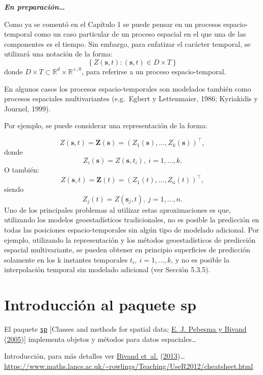 \documentclass[
  spanish,
]{book}
\theoremstyle{break}
\theoremstyle{definition}
\theoremstyle{definition}
\theoremstyle{definition}
\theoremstyle{definition}
\theoremstyle{remark}
\begin{document}
\textbf{\emph{En preparación\ldots{}}}

Como ya se comentó en el Capítulo 1 se puede pensar en un procesos espacio-temporal como un caso particular de un proceso espacial en el que una de las componentes es el tiempo.
Sin embargo, para enfatizar el carácter temporal, se utilizará una notación de la forma:
\[\left\{ Z(\mathbf{s},t):(\mathbf{s},t)\in D\times T\right\}\]
donde \(D\times T\subset \mathbb{R} ^{d} \times \mathbb{R}^{+,0}\), para
referirse a un proceso espacio-temporal.

En algunos casos los procesos espacio-temporales son modelados también
como procesos espaciales multivariantes (e.g.~Egbert y Lettenmaier,
1986; Kyriakidis y Journel, 1999).

Por ejemplo, se puede considerar una representación de la forma:

\[Z(\mathbf{s},t)=\mathbf{Z}(\mathbf{s})=(Z_{1} (\mathbf{s}), \ldots,Z_{k} (
\mathbf{s}))^\top,\]
donde
\[Z_{i} (\mathbf{s})=Z(\mathbf{s},t_{i} ),\  i=1, \ldots,k.\]
O también:
\[Z(\mathbf{s},t) = \mathbf{Z}(t) =  \left(Z_{1}(t), \ldots, Z_{n}(t) \right)^\top,\]
siendo
\[Z_{j} (t)=Z(\mathbf{s}_{j} ,t),\  j=1, \ldots,n.\]
Uno de los principales problemas al utilizar estas aproximaciones es que, utilizando los modelos geoestadísticos tradicionales, no es posible la
predicción en todas las posiciones espacio-temporales sin algún tipo de
modelado adicional. Por ejemplo, utilizando la representación y los métodos geoestadísticos de predicción espacial multivariante, se pueden obtener en principio superficies de predicción solamente en los k instantes temporales \(t_{i} ,\  i=1, \ldots, k\),
y no es posible la interpolación temporal sin modelado adicional (ver Sección 5.3.5).

\hypertarget{appendix-apendices}{%
\appendix}


\hypertarget{intro-sp}{%
\chapter{\texorpdfstring{Introducción al paquete \textbf{sp}}{Introducción al paquete sp}}\label{intro-sp}}

El paquete \href{https://CRAN.R-project.org/package=sp}{\texttt{sp}} {[}Classes and methods for spatial data; \protect\hyperlink{ref-Pebesma2005}{E. J. Pebesma y Bivand} (\protect\hyperlink{ref-Pebesma2005}{2005}){]} implementa objetos y métodos para datos espaciales\ldots{}

Introducción, para más detalles ver \protect\hyperlink{ref-Bivand2013}{Bivand et~al.} (\protect\hyperlink{ref-Bivand2013}{2013})\ldots{}
\url{https://www.maths.lancs.ac.uk/~rowlings/Teaching/UseR2012/cheatsheet.html}
\end{document}

